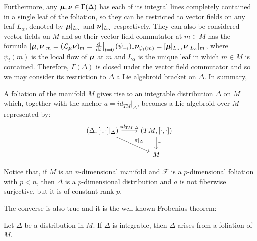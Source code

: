 Furthermore, any $\bm{\mu}, \bm{\nu} \in \Gamma(\Delta)$ has each of its integral lines completely contained in a single leaf of the foliation, so they can be restricted to vector fields on any leaf $L_\alpha$, denoted by $\bm{\mu}|_{L_\alpha}$ and $\bm{\nu}|_{L_\alpha}$ respectively. They can also be considered vector fields on $M$ and so their vector field commutator at $m \in M$ has the formula $[\sect \mu, \sect \nu]_m = (\mathcal L_{\sect \mu} \sect \nu)_m = \der{t}[t = 0] (\psi_{-t})_* \sect \nu_{\psi_t(m)} = [\sect \mu|_{L_\alpha}, \sect \nu|_{L_\alpha}]_m$, where $\psi_t(m)$ is the local flow of $\bm{\mu}$ at $m$ and $L_\alpha$ is the unique leaf in which $m \in M$ is contained. Therefore, $\Gamma(\Delta)$ is closed under the vector field commutator and so we may consider its restriction to $\Delta$ a Lie algebroid bracket on $\Delta$. In summary, 
\begin{proposition}
A foliation of the manifold $M$ gives rise to an integrable distribution $\Delta$ on $M$ which, together with the anchor $a = id_{TM}|_\Delta$, becomes a Lie algebroid over $M$ represented by:
\begin{equation*}
    \begin{tikzcd}
    (\Delta, [\cdot, \cdot]|_{\Delta}) \arrow{r}{id_{TM}|_\Delta} \arrow{dr}{\pi|_\Delta} & (TM, [\cdot, \cdot]) \arrow{d}{\pi}\\
    & M
    \end{tikzcd}
\end{equation*}
\end{proposition}
Notice that, if $M$ is an $n$-dimensional manifold and $\mathcal F$ is a $p$-dimensional foliation with $p < n$, then $\Delta$ is a $p$-dimensional distribution and $a$ is not fiberwise surjective, but it is of constant rank $p$.

The converse is also true and it is the well known Frobenius theorem:

\begin{proposition}
Let $\Delta$ be a distribution in $M$. If $\Delta$ is integrable, then $\Delta$ arises from a foliation of $M$.
\end{proposition}




